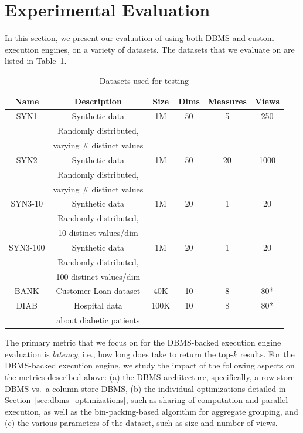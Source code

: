 
\section{Experimental Evaluation}
\label{sec:experiments}
 
In this section, we present our evaluation of
\VizRecDB using both DBMS and custom execution engines, 
on a variety of datasets.
The datasets that we evaluate \VizRecDB on are listed 
in Table~\ref{tab:datasets}.

\begin{table}[htb]
  \centering \scriptsize
  \begin{tabular}{|c|c|c|c|c|c|} \hline
  Name & Description & Size & Dims & Measures & Views \\ \hline
  SYN1 & Synthetic data & 1M & 50 & 5 & 250 \\
  & Randomly distributed, & & & & \\ 
  & varying \# distinct values & & & & \\ \hline
  SYN2 & Synthetic data & 1M & 50 & 20 & 1000 \\
  & Randomly distributed, & & & & \\ 
  & varying \# distinct values & & & & \\ \hline
  SYN3-10 & Synthetic data & 1M & 20 & 1 & 20 \\
  & Randomly distributed, & & & & \\ 
  & 10 distinct values/dim & & & & \\ \hline
  SYN3-100 & Synthetic data & 1M & 20 & 1 & 20 \\
  & Randomly distributed, & & & & \\ 
  & 100 distinct values/dim & & & & \\ \hline
  BANK  & Customer Loan dataset  & 40K & 10 & 8 & 80* \\ \hline
  DIAB  & Hospital data & 100K & 10 & 8 & 80* \\
  & about diabetic patients & & & & \\ \hline
  \end{tabular}
  \vspace{-10pt}
  \caption{Datasets used for testing}
  \label{tab:datasets} 
  \vspace{-10pt}
\end{table}



The primary metric that we focus on for the DBMS-backed execution engine
evaluation is {\em latency},
i.e., how long does \VizRecDB take to return the top-$k$ results.
For the DBMS-backed execution engine, we study the impact of the following
aspects on the metrics described above:
(a) the DBMS architecture, specifically, a row-store DBMS vs.~a column-store DBMS,
(b) the individual optimizations detailed in Section~\ref{sec:dbms_optimizations},
such as sharing of computation and parallel execution, as well as 
the bin-packing-based algorithm for aggregate grouping, and
(c) the various parameters of the dataset, such as size and number of views.

